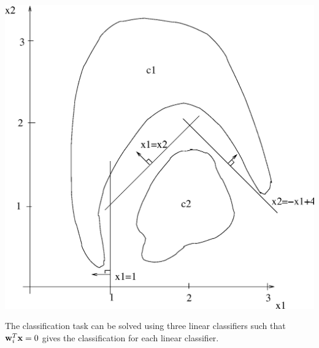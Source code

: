 \begin{enumerate}
\begin{solution}
    \begin{center}
      \includegraphics[scale=0.35]{e61.eps}
    \end{center}

    The classification task can be solved using three linear classifiers
    such that ${\bf{w}}_i^T{\bf{x}}=0$ gives the classification for each
    linear classifier.


\end{solution}
\end{enumerate}
